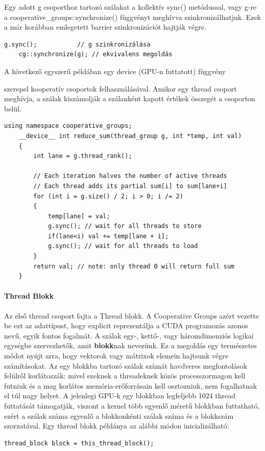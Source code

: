 Egy adott g csoporthoz tartozó szálakat a kollektív sync() metódussal, vagy g-re a cooperative\_groups::synchronize() függvényt meghívva szinkronizálhatjuk. Ezek a már korábban emlegetett barrier szinkronizációt hajtják végre.
\begin{lstlisting}[style=CStyle]
	g.sync();           // g szinkronizálása
	cg::synchronize(g); // ekvivalens megoldás
\end{lstlisting}

\hypertarget{reducesum}{A következő egyszerű példában egy device (GPU-n futtatott) függvény} szerepel kooperatív csoportok felhasználásával. Amikor egy thread csoport meghívja, a szálak kiszámolják a szálanként kapott értékek összegét a csoporton belül.
\begin{lstlisting}[style=CStyle]
	using namespace cooperative_groups;
	__device__ int reduce_sum(thread_group g, int *temp, int val)
	{
		int lane = g.thread_rank();
		
		// Each iteration halves the number of active threads
		// Each thread adds its partial sum[i] to sum[lane+i]
		for (int i = g.size() / 2; i > 0; i /= 2)
		{
			temp[lane] = val;
			g.sync(); // wait for all threads to store
			if(lane<i) val += temp[lane + i];
			g.sync(); // wait for all threads to load
		}
		return val; // note: only thread 0 will return full sum
	}
\end{lstlisting}

\paragraph{Thread Blokk}
Az első thread csoport fajta a Thread blokk. A Cooperative Groups azért vezette be ezt az adattípust, hogy explicit reprezentálja a CUDA programozás azonos nevű, egyik fontos fogalmát. A szálak egy-, kettő-, vagy háromdimenziós logikai egységbe szervezhetők, amit \textbf{blokk}nak nevezünk. Ez a megoldás egy természetes módot nyújt arra, hogy vektorok vagy mátrixok elemein hajtsunk végre számításokat. 
Az egy blokkba tartozó szálak számát havdveres megfontolások felülről korlátozzák: mivel ezeknek a threadeknek közös processzormagon kell futniuk és a mag korlátos memória-erőforrásain kell osztozniuk, nem fogalhatnak el túl nagy helyet. A jelenlegi GPU-k egy blokkban legfeljebb 1024 thread futtatását támogatják, viszont a kernel több egyenlő méretű blokkban futtatható, ezért a szálak száma egyenlő a blokkonkénti szálak száma és a blokkszám szorzatával. \cite{kvantum_optim}
Egy thread blokk példánya az alábbi módon inicializálható:
\begin{lstlisting}[style=CStyle]
	thread_block block = this_thread_block();
\end{lstlisting}

